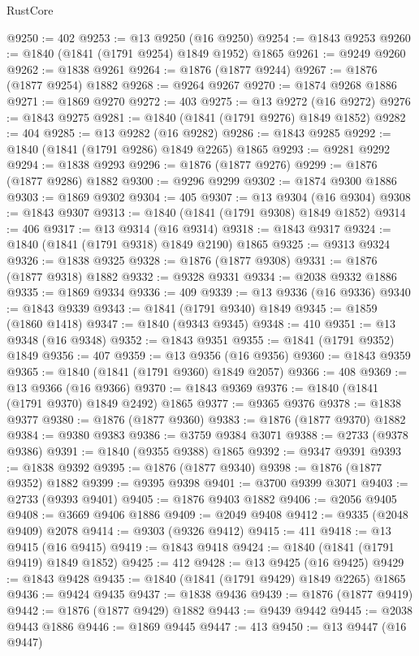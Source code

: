 \begin{lexlean}{RustCore}
\begin{coremodule}
@9250 := 402
@9253 := @13 @9250 (@16 @9250)
@9254 := @1843 @9253
@9260 := @1840 (@1841 (@1791 @9254) @1849 @1952) @1865
@9261 := @9249 @9260
@9262 := @1838 @9261
@9264 := @1876 (@1877 @9244)
@9267 := @1876 (@1877 @9254) @1882
@9268 := @9264 @9267
@9270 := @1874 @9268 @1886
@9271 := @1869 @9270
@9272 := 403
@9275 := @13 @9272 (@16 @9272)
@9276 := @1843 @9275
@9281 := @1840 (@1841 (@1791 @9276) @1849 @1852)
@9282 := 404
@9285 := @13 @9282 (@16 @9282)
@9286 := @1843 @9285
@9292 := @1840 (@1841 (@1791 @9286) @1849 @2265) @1865
@9293 := @9281 @9292
@9294 := @1838 @9293
@9296 := @1876 (@1877 @9276)
@9299 := @1876 (@1877 @9286) @1882
@9300 := @9296 @9299
@9302 := @1874 @9300 @1886
@9303 := @1869 @9302
@9304 := 405
@9307 := @13 @9304 (@16 @9304)
@9308 := @1843 @9307
@9313 := @1840 (@1841 (@1791 @9308) @1849 @1852)
@9314 := 406
@9317 := @13 @9314 (@16 @9314)
@9318 := @1843 @9317
@9324 := @1840 (@1841 (@1791 @9318) @1849 @2190) @1865
@9325 := @9313 @9324
@9326 := @1838 @9325
@9328 := @1876 (@1877 @9308)
@9331 := @1876 (@1877 @9318) @1882
@9332 := @9328 @9331
@9334 := @2038 @9332 @1886
@9335 := @1869 @9334
@9336 := 409
@9339 := @13 @9336 (@16 @9336)
@9340 := @1843 @9339
@9343 := @1841 (@1791 @9340) @1849
@9345 := @1859 (@1860 @1418)
@9347 := @1840 (@9343 @9345)
@9348 := 410
@9351 := @13 @9348 (@16 @9348)
@9352 := @1843 @9351
@9355 := @1841 (@1791 @9352) @1849
@9356 := 407
@9359 := @13 @9356 (@16 @9356)
@9360 := @1843 @9359
@9365 := @1840 (@1841 (@1791 @9360) @1849 @2057)
@9366 := 408
@9369 := @13 @9366 (@16 @9366)
@9370 := @1843 @9369
@9376 := @1840 (@1841 (@1791 @9370) @1849 @2492) @1865
@9377 := @9365 @9376
@9378 := @1838 @9377
@9380 := @1876 (@1877 @9360)
@9383 := @1876 (@1877 @9370) @1882
@9384 := @9380 @9383
@9386 := @3759 @9384 @3071
@9388 := @2733 (@9378 @9386)
@9391 := @1840 (@9355 @9388) @1865
@9392 := @9347 @9391
@9393 := @1838 @9392
@9395 := @1876 (@1877 @9340)
@9398 := @1876 (@1877 @9352) @1882
@9399 := @9395 @9398
@9401 := @3700 @9399 @3071
@9403 := @2733 (@9393 @9401)
@9405 := @1876 @9403 @1882
@9406 := @2056 @9405
@9408 := @3669 @9406 @1886
@9409 := @2049 @9408
@9412 := @9335 (@2048 @9409) @2078
@9414 := @9303 (@9326 @9412)
@9415 := 411
@9418 := @13 @9415 (@16 @9415)
@9419 := @1843 @9418
@9424 := @1840 (@1841 (@1791 @9419) @1849 @1852)
@9425 := 412
@9428 := @13 @9425 (@16 @9425)
@9429 := @1843 @9428
@9435 := @1840 (@1841 (@1791 @9429) @1849 @2265) @1865
@9436 := @9424 @9435
@9437 := @1838 @9436
@9439 := @1876 (@1877 @9419)
@9442 := @1876 (@1877 @9429) @1882
@9443 := @9439 @9442
@9445 := @2038 @9443 @1886
@9446 := @1869 @9445
@9447 := 413
@9450 := @13 @9447 (@16 @9447)

\end{coremodule}
\end{lexlean}
